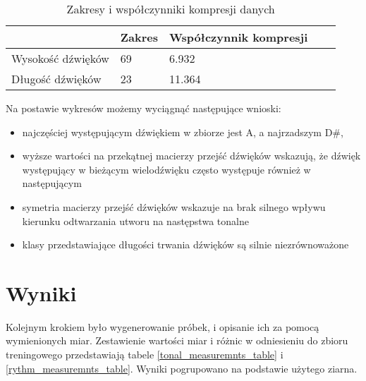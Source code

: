 {{        %
        \begin{table}
            \begin{center}
                \begin{tabular}{ |p{2.5cm}|p{2.5cm}|p{2.5cm}|p{2.5cm}|p{2.5cm}| }
                \hline
                 & Zakres & Współczynnik kompresji \\ 
                \hline
                Wysokość dźwięków & 69 & 6.932 \\  
                \hline
                Długość dźwięków & 23 & 11.364 \\
                \hline
                \end{tabular}
            \end{center}
            \caption{Zakresy i współczynniki kompresji danych} \label{range_and_compression}
        \end{table}

        \pagebreak

        Na postawie wykresów możemy wyciągnąć następujące wnioski:
        \begin{itemize}
            \item najczęściej występującym dźwiękiem w zbiorze jest A, a najrzadszym D\#,
            \item wyższe wartości na przekątnej macierzy przejść dźwięków wskazują, że dźwięk występujący w bieżącym wielodźwięku
            często występuje również w następującym
            \item symetria macierzy przejść dźwięków wskazuje na brak silnego wpływu kierunku odtwarzania utworu na następstwa tonalne
            \item klasy przedstawiające długości trwania dźwięków są silnie niezrównoważone
        \end{itemize}
    }

    \section{Wyniki}
    {
        Kolejnym krokiem było wygenerowanie próbek, i opisanie ich za pomocą wymienionych miar. Zestawienie wartości miar i różnic
        w odniesieniu do zbioru treningowego przedstawiają tabele \ref{tonal_measuremnts_table} i \ref{rythm_measuremnts_table}. Wyniki pogrupowano na podstawie użytego ziarna.

}}
